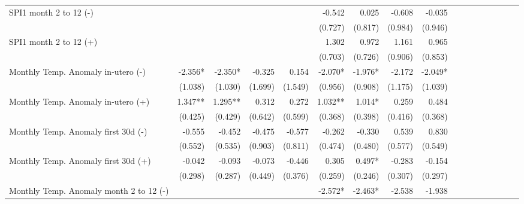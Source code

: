 \begin{table}[H]
\begin{adjustbox}{max width=\linewidth}
\begin{tabular}{lrrrrrrrrrrrrrrrr}
SPI1 month 2 to 12  (-)                      &             &             &             &             &       -0.542 &        0.025 &       -0.608 &       -0.035  \\
                                             &             &             &             &             &      (0.727) &      (0.817) &      (0.984) &      (0.946)  \\
SPI1 month 2 to 12  (+)                      &             &             &             &             &        1.302 &        0.972 &        1.161 &        0.965  \\
                                             &             &             &             &             &      (0.703) &      (0.726) &      (0.906) &      (0.853)  \\
Monthly Temp. Anomaly in-utero   (-)         &     -2.356* &     -2.350* &      -0.325 &       0.154 &      -2.070* &      -1.976* &       -2.172 &      -2.049*  \\
                                             &     (1.038) &     (1.030) &     (1.699) &     (1.549) &      (0.956) &      (0.908) &      (1.175) &      (1.039)  \\
Monthly Temp. Anomaly in-utero  (+)          &     1.347** &     1.295** &       0.312 &       0.272 &      1.032** &       1.014* &        0.259 &        0.484  \\
                                             &     (0.425) &     (0.429) &     (0.642) &     (0.599) &      (0.368) &      (0.398) &      (0.416) &      (0.368)  \\
Monthly Temp. Anomaly first 30d   (-)        &      -0.555 &      -0.452 &      -0.475 &      -0.577 &       -0.262 &       -0.330 &        0.539 &        0.830  \\
                                             &     (0.552) &     (0.535) &     (0.903) &     (0.811) &      (0.474) &      (0.480) &      (0.577) &      (0.549)  \\
Monthly Temp. Anomaly first 30d (+)          &      -0.042 &      -0.093 &      -0.073 &      -0.446 &        0.305 &       0.497* &       -0.283 &       -0.154  \\
                                             &     (0.298) &     (0.287) &     (0.449) &     (0.376) &      (0.259) &      (0.246) &      (0.307) &      (0.297)  \\
Monthly Temp. Anomaly month 2 to 12 (-)      &             &             &             &             &      -2.572* &      -2.463* &       -2.538 &       -1.938  \\

\end{tabular}
\end{adjustbox}
\end{table}
